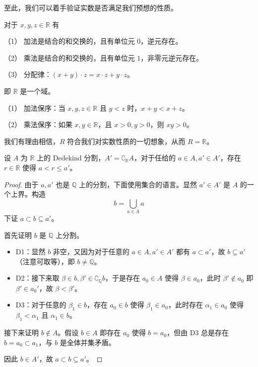 至此，我们可以着手验证实数是否满足我们预想的性质。

\begin{theorem}
	对于 $x,y,z\in \mathbb{R}$ 有

	（1） 加法是结合的和交换的，且有单位元 $0$，逆元存在。

	（2） 乘法是结合的和交换的，且有单位元 $1$，非零元逆元存在。

	（3） 分配律：$(x+y) \cdot  z = x \cdot z + y\cdot z$。
\end{theorem}

即 $\mathbb{R}$ 是一个域。

\begin{theorem}
	（1） 加法保序：当 $x,y,z\in \mathbb{R}$ 且 $y<z$ 时，$x+y<x+z$。

	（2） 乘法保序：如果 $x,y\in \mathbb{R}$，且 $x>0,y>0$，则 $xy>0$。
\end{theorem}

我们有理由相信，$R$ 符合我们对实数性质的一切想象，从而 $R = \mathbb{R}$。

\begin{theorem}[Dedekind 原理]
	设 $A$ 为 $\mathbb{R}$ 上的 Dedekind 分割，$A' = \complement_\mathbb{R} A$，对于任给的 $a\in A,a' \in A'$，存在 $r \in \mathbb{R}$ 使得 $a < r \leqslant a'$。
\end{theorem}

\begin{proof}
	由于 $a, a'$ 也是 $\mathbb{Q}$ 上的分割，下面使用集合的语言。显然 $a' \in A'$ 是 $A$ 的一个上界。构造
	\[ b = \bigcup_{a \in A} a \]
	下证 $a \subset b \subseteq a'$。

	首先证明 $b$ 是 $\mathbb{Q}$ 上分割。

	\begin{itemize}
		\item D1：显然 $b$ 非空，又因为对于任意的 $a \in A, a' \in A'$ 都有 $a \subset a'$，故 $b \subseteq a'$（注意可取等），即 $b \neq \mathbb{Q}$。
		\item D2：接下来取 $\beta \in b, \beta' \in \complement_\mathbb{Q} b$，于是存在 $a_0 \in A$ 使得 $\beta \in a_0$，此时 $\beta' \notin a_0$ 即 $\beta' \in a_0'$，故 $\beta < \beta'$。
		\item D3：对于任意的 $\beta_1 \in b$，存在 $a_0 \in b$ 使得 $\beta_1 \in a_0$，此时存在 $\alpha_1 \in a_0$ 使得 $\beta_1 < \alpha_1$ 且 $\alpha_1 \in b$。
	\end{itemize}


	接下来证明 $b \notin A$。假设 $b \in A$ 即存在 $a_0$ 使得 $b = a_0$，但由 D3 总是存在 $b = a_0 \subset a_1$，与 $b$ 是全体并集矛盾。

	因此 $b \in A'$，故 $a \subset b \subseteq a'$。
\end{proof}

